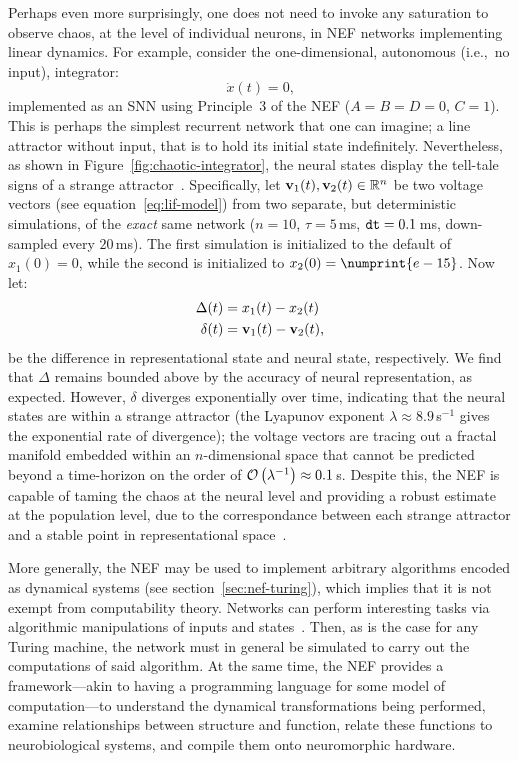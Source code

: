 Perhaps even more surprisingly, one does not need to invoke any saturation to observe chaos, at the level of individual neurons, in NEF networks implementing linear dynamics.
For example, consider the one-dimensional, autonomous (i.e.,~no input), integrator:
$$\dot{x}(t) = 0 \text{,}$$
implemented as an SNN using Principle~3 of the NEF ($A = B = D = 0$, $C = 1$).
This is perhaps the simplest recurrent network that one can imagine; a line attractor without input, that is to hold its initial state indefinitely.
Nevertheless, as shown in Figure~\ref{fig:chaotic-integrator}, the neural states display the tell-tale signs of a strange attractor~\citep[cf.~][Figure~9.3.5]{strogatz2000nonlinear}.
Specifically, let $\mathbf{v}_1(t), \mathbf{v}_2(t) \in \mathbb{R}^n$ be two voltage vectors (see equation~\ref{eq:lif-model}) from two separate, but deterministic simulations, of the \emph{exact} same network ($n = 10$, $\tau = 5$\,ms, $\texttt{dt}{} = 0.1$\,ms, down-sampled every $20$\,ms).
The first simulation is initialized to the default of $x_1(0) = 0$, while the second is initialized to $x_2(0) = \numprint{e-15}$.
Now let:
\begin{align*}
\Delta(t) &= x_1(t) - x_2(t) \\
\delta(t) &= \mathbf{v}_1(t) - \mathbf{v}_2(t) \text{,}
\end{align*}
be the difference in representational state and neural state, respectively.
We find that $\Delta$ remains bounded above by the accuracy of neural representation, as expected.
However, $\delta$ diverges exponentially over time, indicating that the neural states are within a strange attractor (the Lyapunov exponent $\lambda \approx 8.9$\,s${}^{-1}$ gives the exponential rate of divergence); the voltage vectors are tracing out a fractal manifold embedded within an $n$-dimensional space that cannot be predicted beyond a time-horizon on the order of $\mathcal{O}\left({\lambda^{-1}}\right) \approx 0.1$\,s.
Despite this, the NEF is capable of taming the chaos at the neural level and providing a robust estimate at the population level, due to the correspondance between each strange attractor and a stable point in representational space~\citep[][p.~237]{eliasmith2003a}.

More generally, the NEF may be used to implement arbitrary algorithms encoded as dynamical systems (see section~\ref{sec:nef-turing}), which implies that it is not exempt from computability theory. 
Networks can perform interesting tasks via algorithmic manipulations of inputs and states~\citep{choo2018}.
Then, as is the case for any Turing machine, the network must in general be simulated to carry out the computations of said algorithm.
At the same time, the NEF provides a framework---akin to having a programming language for some model of computation---to understand the dynamical transformations being performed, examine relationships between structure and function, relate these functions to neurobiological systems, and compile them onto neuromorphic hardware.

